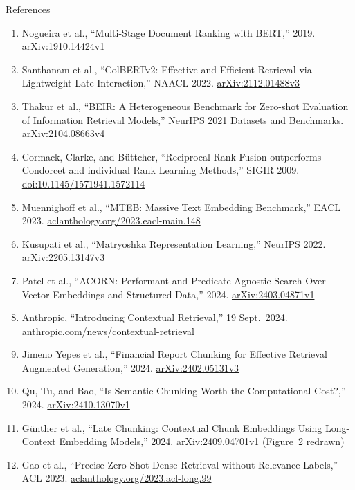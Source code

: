 \begin{frame}[allowframebreaks]{References}
\begin{enumerate}
    \item Nogueira et al., ``Multi-Stage Document Ranking with BERT,'' 2019. \href{https://arxiv.org/abs/1910.14424v1}{arXiv:1910.14424v1}
    \item Santhanam et al., ``ColBERTv2: Effective and Efficient Retrieval via Lightweight Late Interaction,'' NAACL 2022. \href{https://arxiv.org/abs/2112.01488v3}{arXiv:2112.01488v3}
    \item Thakur et al., ``BEIR: A Heterogeneous Benchmark for Zero-shot Evaluation of Information Retrieval Models,'' NeurIPS 2021 Datasets and Benchmarks. \href{https://arxiv.org/abs/2104.08663v4}{arXiv:2104.08663v4}
    \item Cormack, Clarke, and B\"uttcher, ``Reciprocal Rank Fusion outperforms Condorcet and individual Rank Learning Methods,'' SIGIR 2009. \href{https://doi.org/10.1145/1571941.1572114}{doi:10.1145/1571941.1572114}
    \item Muennighoff et al., ``MTEB: Massive Text Embedding Benchmark,'' EACL 2023. \href{https://aclanthology.org/2023.eacl-main.148/}{aclanthology.org/2023.eacl-main.148}
    \item Kusupati et al., ``Matryoshka Representation Learning,'' NeurIPS 2022. \href{https://arxiv.org/abs/2205.13147v3}{arXiv:2205.13147v3}
    \item Patel et al., ``ACORN: Performant and Predicate-Agnostic Search Over Vector Embeddings and Structured Data,'' 2024. \href{https://arxiv.org/abs/2403.04871v1}{arXiv:2403.04871v1}
    \item Anthropic, ``Introducing Contextual Retrieval,'' 19 Sept.\ 2024. \href{https://www.anthropic.com/news/contextual-retrieval}{anthropic.com/news/contextual-retrieval}
    \item Jimeno Yepes et al., ``Financial Report Chunking for Effective Retrieval Augmented Generation,'' 2024. \href{https://arxiv.org/abs/2402.05131v3}{arXiv:2402.05131v3}
    \item Qu, Tu, and Bao, ``Is Semantic Chunking Worth the Computational Cost?,'' 2024. \href{https://arxiv.org/abs/2410.13070v1}{arXiv:2410.13070v1}
    \item G\"unther et al., ``Late Chunking: Contextual Chunk Embeddings Using Long-Context Embedding Models,'' 2024. \href{https://arxiv.org/abs/2409.04701v1}{arXiv:2409.04701v1} (Figure~2 redrawn)
    \item Gao et al., ``Precise Zero-Shot Dense Retrieval without Relevance Labels,'' ACL 2023. \href{https://aclanthology.org/2023.acl-long.99/}{aclanthology.org/2023.acl-long.99}

\end{enumerate}
\end{frame}
